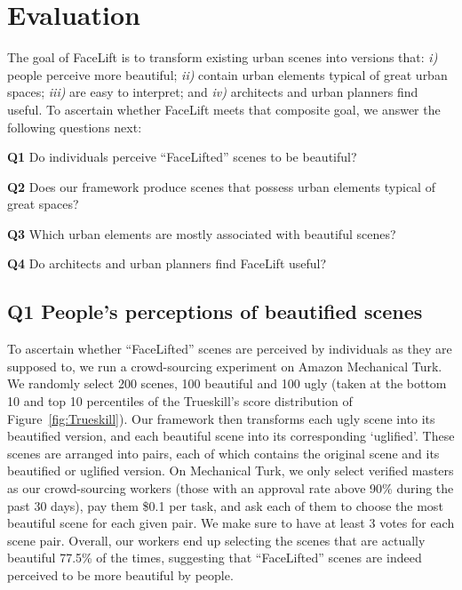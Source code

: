 \section{Evaluation}
\label{sec:evaluation}

The goal of FaceLift is to transform existing urban scenes into versions that: \emph{i)} people perceive more beautiful; \emph{ii)} contain urban elements typical of great urban spaces; \emph{iii)} are easy to interpret; and \emph{iv)} architects and urban planners find useful. To ascertain whether FaceLift meets that composite goal, we answer the following questions next: 

\begin{description}
\item{\textbf{Q1}} Do individuals perceive ``FaceLifted'' scenes to be beautiful?

\item{\textbf{Q2}}  Does our framework produce scenes that possess urban elements typical of great spaces?

\item{\textbf{Q3}}  Which urban elements are mostly associated with beautiful scenes?

\item{\textbf{Q4}}  Do architects and urban planners find FaceLift useful?

\end{description}


\subsection*{Q1 People's perceptions of beautified scenes}
To ascertain whether ``FaceLifted'' scenes are perceived by individuals as they are supposed to, we run a crowd-sourcing experiment on Amazon Mechanical Turk.  We randomly select 200 scenes, 100 beautiful and 100 ugly  (taken at the bottom 10 and top 10 percentiles of the Trueskill's score distribution of Figure~\ref{fig:Trueskill}). Our framework then transforms each ugly scene into its beautified version, and each beautiful scene into its corresponding `uglified'. These scenes are arranged into pairs, each of which contains the original scene and its beautified or uglified version. On  Mechanical Turk, we only select verified masters as our crowd-sourcing workers (those with an approval rate above 90\% during the past 30 days), pay them \$0.1 per  task,  and ask each of them to choose the most beautiful scene for each given pair.  We make sure to have at least 3 votes for each scene pair. Overall, our workers end up selecting the scenes that are actually beautiful 77.5\% of the times, suggesting that ``FaceLifted'' scenes are indeed perceived to be more beautiful by people. 


